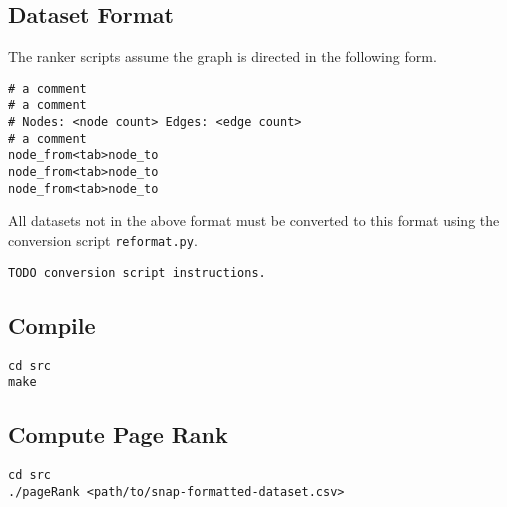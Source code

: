 \documentclass[draft]{report}
\begin{document}
\subsection{Dataset Format}
The ranker scripts assume the graph is directed in the following form.

\begin{lstlisting}
# a comment
# a comment
# Nodes: <node count> Edges: <edge count>
# a comment
node_from<tab>node_to
node_from<tab>node_to
node_from<tab>node_to
\end{lstlisting}

All datasets not in the above format must be converted to this format using the conversion script \texttt{reformat.py}.

\begin{lstlisting}
TODO conversion script instructions.
\end{lstlisting}

\subsection{Compile}
\begin{lstlisting}
cd src
make
\end{lstlisting}

\subsection{Compute Page Rank}
\begin{lstlisting}
cd src
./pageRank <path/to/snap-formatted-dataset.csv>
\end{lstlisting}
\end{document}
